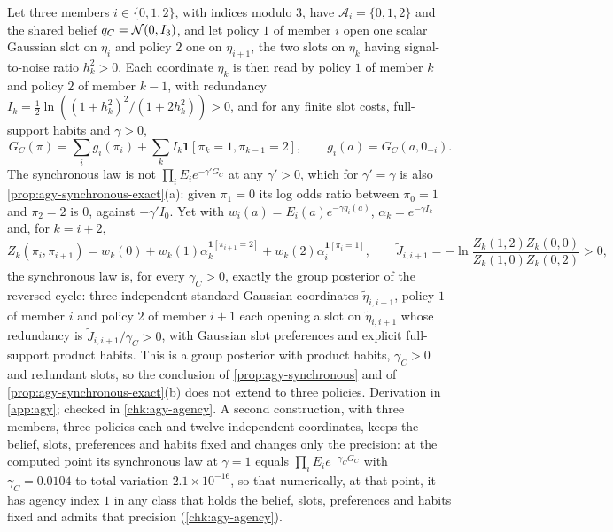 \begin{example}\label{ex:agy-synchronous-cycle}
Let three members $i\in\{0,1,2\}$, with indices modulo $3$, have $\mathcal A_i=\{0,1,2\}$ and the shared belief $q_C=\mathcal{N}(0,I_3)$, and let policy $1$ of member $i$ open one scalar Gaussian slot on $\eta_i$ and policy $2$ one on $\eta_{i+1}$, the two slots on $\eta_k$ having signal-to-noise ratio $h_k^2>0$. Each coordinate $\eta_k$ is then read by policy $1$ of member $k$ and policy $2$ of member $k-1$, with redundancy $I_k=\frac12\ln((1+h_k^2)^2/(1+2h_k^2))>0$, and for any finite slot costs, full-support habits and $\gamma>0$,
\begin{equation*}
G_C(\pi)=\sum_ig_i(\pi_i)+\sum_kI_k\mathbf 1[\pi_k=1,\pi_{k-1}=2],\qquad g_i(a)=G_C(a,0_{-i}).
\end{equation*}
The synchronous law is not $\prod_iE_ie^{-\gamma'G_C}$ at any $\gamma'>0$, which for $\gamma'=\gamma$ is also \cref{prop:agy-synchronous-exact}(a): given $\pi_1=0$ its log odds ratio between $\pi_0=1$ and $\pi_2=2$ is $0$, against $-\gamma'I_0$. Yet with $w_i(a)=E_i(a)e^{-\gamma g_i(a)}$, $\alpha_k=e^{-\gamma I_k}$ and, for $k=i+2$,
\begin{equation*}
Z_k(\pi_i,\pi_{i+1})=w_k(0)+w_k(1)\alpha_k^{\mathbf 1[\pi_{i+1}=2]}+w_k(2)\alpha_i^{\mathbf 1[\pi_i=1]},\qquad\tilde J_{i,i+1}=-\ln\frac{Z_k(1,2)Z_k(0,0)}{Z_k(1,0)Z_k(0,2)}>0,
\end{equation*}
the synchronous law is, for every $\gamma_C>0$, exactly the group posterior of the reversed cycle: three independent standard Gaussian coordinates $\tilde\eta_{i,i+1}$, policy $1$ of member $i$ and policy $2$ of member $i+1$ each opening a slot on $\tilde\eta_{i,i+1}$ whose redundancy is $\tilde J_{i,i+1}/\gamma_C>0$, with Gaussian slot preferences and explicit full-support product habits. This is a group posterior with product habits, $\gamma_C>0$ and redundant slots, so the conclusion of \cref{prop:agy-synchronous} and of \cref{prop:agy-synchronous-exact}(b) does not extend to three policies. Derivation in \cref{app:agy}; checked in \cref{chk:agy-agency}. A second construction, with three members, three policies each and twelve independent coordinates, keeps the belief, slots, preferences and habits fixed and changes only the precision: at the computed point its synchronous law at $\gamma=1$ equals $\prod_iE_ie^{-\gamma_CG_C}$ with $\gamma_C=0.0104$ to total variation $2.1\times10^{-16}$, so that numerically, at that point, it has agency index $1$ in any class that holds the belief, slots, preferences and habits fixed and admits that precision (\cref{chk:agy-agency}).
\end{example}

